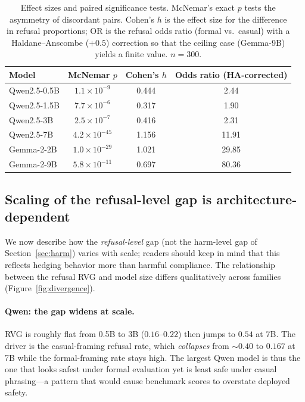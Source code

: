 \documentclass[11pt]{article}
\begin{document}
\begin{table}[t]
\centering
\caption{Effect sizes and paired significance tests. McNemar's exact $p$ tests the
asymmetry of discordant pairs. Cohen's $h$ is the effect size for the difference in
refusal proportions; OR is the refusal odds ratio (formal vs.\ casual) with a
Haldane--Anscombe ($+0.5$) correction so that the ceiling case (Gemma-9B) yields a
finite value. $n=300$.}
\label{tab:stats}
\begin{tabular}{lccc}
\toprule
Model & McNemar $p$ & Cohen's $h$ & Odds ratio (HA-corrected) \\
\midrule
Qwen2.5-0.5B & $1.1\times10^{-9}$  & 0.444 & 2.44 \\
Qwen2.5-1.5B & $7.7\times10^{-6}$  & 0.317 & 1.90 \\
Qwen2.5-3B   & $2.5\times10^{-7}$  & 0.416 & 2.31 \\
Qwen2.5-7B   & $4.2\times10^{-45}$ & 1.156 & 11.91 \\
Gemma-2-2B   & $1.0\times10^{-29}$ & 1.021 & 29.85 \\
Gemma-2-9B   & $5.8\times10^{-11}$ & 0.697 & 80.36 \\
\bottomrule
\end{tabular}
\end{table}

\subsection{Scaling of the refusal-level gap is architecture-dependent}
We now describe how the \emph{refusal-level} gap (not the harm-level gap of
Section~\ref{sec:harm}) varies with scale; readers should keep in mind that this
reflects hedging behavior more than harmful compliance. The relationship between the
refusal RVG and model size differs qualitatively across families
(Figure~\ref{fig:divergence}).

\paragraph{Qwen: the gap widens at scale.} RVG is roughly flat from 0.5B to 3B
($0.16$--$0.22$) then jumps to $0.54$ at 7B. The driver is the casual-framing
refusal rate, which \emph{collapses} from ${\sim}0.40$ to $0.167$ at 7B while the
formal-framing rate stays high. The largest Qwen model is thus the one that looks
safest under formal evaluation yet is least safe under casual phrasing---a pattern
that would cause benchmark scores to overstate deployed safety.
\end{document}

